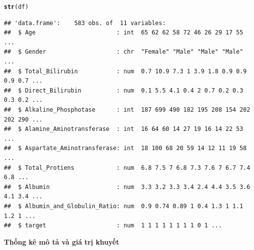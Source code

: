 \documentclass[14pt,a4paper]{extarticle}\usepackage[]{graphicx}\usepackage[]{xcolor}
\makeatletter
\newcommand{\hldef}[1]{\textcolor[rgb]{0.345,0.345,0.345}{#1}}%
\newcommand{\hlkwd}[1]{\textcolor[rgb]{0.737,0.353,0.396}{\textbf{#1}}}%
\newenvironment{kframe}{%
 \def\at@end@of@kframe{}%
 \ifinner\ifhmode%
  \def\at@end@of@kframe{\end{minipage}}%
  \begin{minipage}{\columnwidth}%
 \fi\fi%
 \def\FrameCommand##1{\hskip\@totalleftmargin \hskip-\fboxsep
 \colorbox{shadecolor}{##1}\hskip-\fboxsep
     \hskip-\linewidth \hskip-\@totalleftmargin \hskip\columnwidth}%
 \MakeFramed {\advance\hsize-\width
   \@totalleftmargin\z@ \linewidth\hsize
   \@setminipage}}%
 {\par\unskip\endMakeFramed%
 \at@end@of@kframe}
\newenvironment{knitrout}{}{} %
\makeatother
\begin{document}
\begin{knitrout}\scriptsize
{}\color{fgcolor}\begin{kframe}
\begin{alltt}
\hlkwd{str}\hldef{(df)}
\end{alltt}
\begin{verbatim}
## 'data.frame':	583 obs. of  11 variables:
##  $ Age                       : int  65 62 62 58 72 46 26 29 17 55 ...
##  $ Gender                    : chr  "Female" "Male" "Male" "Male" ...
##  $ Total_Bilirubin           : num  0.7 10.9 7.3 1 3.9 1.8 0.9 0.9 0.9 0.7 ...
##  $ Direct_Bilirubin          : num  0.1 5.5 4.1 0.4 2 0.7 0.2 0.3 0.3 0.2 ...
##  $ Alkaline_Phosphotase      : int  187 699 490 182 195 208 154 202 202 290 ...
##  $ Alamine_Aminotransferase  : int  16 64 60 14 27 19 16 14 22 53 ...
##  $ Aspartate_Aminotransferase: int  18 100 68 20 59 14 12 11 19 58 ...
##  $ Total_Protiens            : num  6.8 7.5 7 6.8 7.3 7.6 7 6.7 7.4 6.8 ...
##  $ Albumin                   : num  3.3 3.2 3.3 3.4 2.4 4.4 3.5 3.6 4.1 3.4 ...
##  $ Albumin_and_Globulin_Ratio: num  0.9 0.74 0.89 1 0.4 1.3 1 1.1 1.2 1 ...
##  $ target                    : num  1 1 1 1 1 1 1 1 0 1 ...
\end{verbatim}
\end{kframe}
\end{knitrout}

\medskip\noindent\textbf{Thống kê mô tả và giá trị khuyết}\par\smallskip
\end{document}
